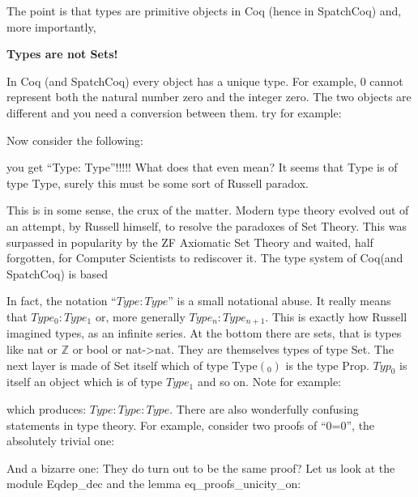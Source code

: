 The point is that types are primitive objects in Coq (hence in SpatchCoq) and, more importantly, 

{\bf \Large Types are not Sets!}

In Coq (and SpatchCoq) every object has a unique type. For example, 0 cannot represent both the natural number zero and the integer zero. The two objects are different and you need a conversion between them. try for example:




Now consider the following:


you get ``Type: Type''!!!!! What does that even mean? It seems that Type is of type Type, surely this must be some sort of Russell paradox.

This is in some sense, the crux of the matter. Modern type theory evolved out of an attempt, 
by Russell himself, to resolve the paradoxes of Set Theory. This was surpassed in popularity by the ZF Axiomatic Set Theory and waited, half forgotten, for Computer Scientists to rediscover it. The type system of Coq(and SpatchCoq) is based 

In fact, the notation ``$Type : Type$'' is a small notational abuse. It really means that $Type_{0} : Type_{1}$ or, more generally $Type_{n} : Type_{n+1}$. This is exactly how Russell imagined types,  as an infinite series. At the bottom there are sets, that is types like nat or $\mathbb{Z}$ or bool or nat->nat. They are themselves types of type Set. The next layer is made of Set itself which of type Type$(_{0})$ is the type Prop. $Typ_{0}$ is itself an object which is of type $Type_{1}$ and so on. Note for example:

 which produces:
$Type : Type
     : Type$.
 There are also wonderfully confusing statements in type theory. For example, consider  two proofs of ``0=0'', the absolutely trivial one:

And a bizarre one:
They do turn out to be the same proof? Let us look at the  module Eqdep\_dec and the lemma eq\_proofs\_unicity\_on: 

